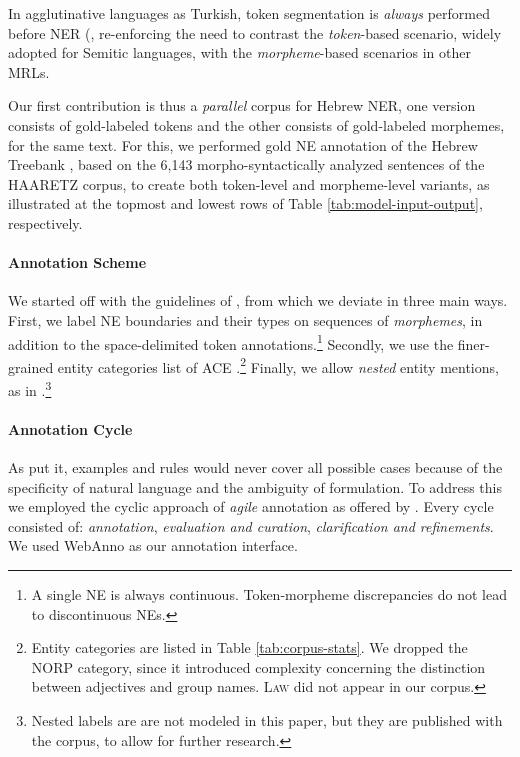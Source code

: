 \documentclass[11pt,a4paper]{article}
\newcommand{\MORMACRO}{{\em morpheme}\xspace}
\begin{document}
In  agglutinative languages  as Turkish, token segmentation is {\em always} performed before NER (\citet{tur-data-2003,turk-tweet-seker}, re-enforcing the need to contrast the  {\em token}-based scenario, widely adopted for Semitic languages, with the \MORMACRO-based scenarios in other MRLs. 

Our  first contribution is thus a   {\em parallel} corpus for Hebrew NER, one version consists of gold-labeled tokens and the other consists of gold-labeled morphemes, for the same text. 
For this, we performed gold NE annotation of the Hebrew Treebank \cite{simaan2001}, based on the 6,143  morpho-syntactically analyzed sentences of the HAARETZ corpus, to create both token-level and morpheme-level variants, as illustrated   at the topmost and lowest rows of Table \ref{tab:model-input-output}, respectively.


\paragraph{Annotation Scheme} We  started off with the guidelines of \citet{naama}, from which we deviate in three main ways. First, 
we label NE boundaries and their types on sequences of {\em morphemes}, 
in addition to the space-delimited token annotations.\footnote{A single NE is always continuous. Token-morpheme discrepancies do not lead to discontinuous NEs.}
Secondly, we use the  finer-grained entity categories list of ACE \cite{linguistic2008ace}.\footnote{Entity categories are listed in Table \ref{tab:corpus-stats}.
We dropped the \textsc{NORP} category, since it introduced complexity concerning the distinction between adjectives and group names. \textsc{Law} did not appear in our corpus.}
Finally, we allow {\em nested} entity mentions, as in  \citet{Finkel:2009:NNE:1699510.1699529,benikova-etal-2014-nosta}.\footnote{Nested labels are  are not modeled in this paper, but they are published with the corpus, to allow for further research.}


\paragraph{Annotation Cycle}
As  \citet{fort-etal-2009-towards} put it,
examples and rules would never cover all possible cases because of the specificity of natural language and the ambiguity of formulation.
To address this we employed the cyclic approach of 
{\em agile}  annotation as offered by \citet{alex-etal-2010-agile}. Every cycle consisted of: {\em annotation}, {\em evaluation and  curation}, {\em clarification and  refinements}.  We used WebAnno \cite{yimam-etal-2013-webanno} as our annotation interface. 
\end{document}
